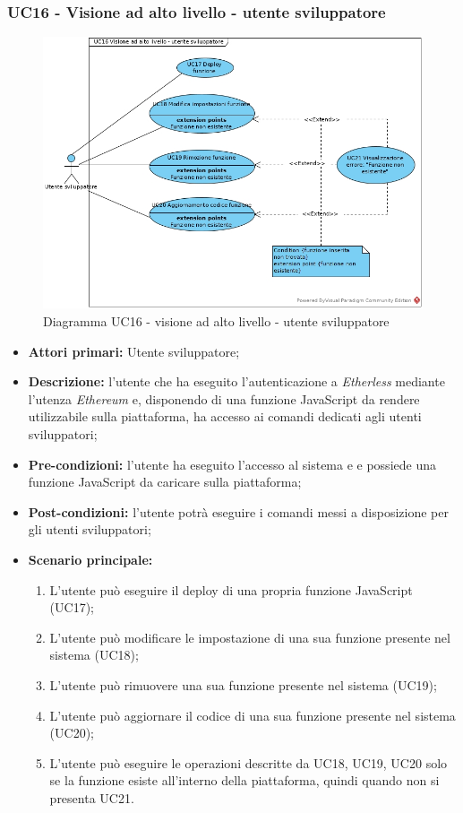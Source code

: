 \subsubsection{UC16 - Visione ad alto livello - utente sviluppatore}
\begin{figure}[h]
	\centering
	\includegraphics[width=\linewidth]{res/img/UC16.jpg}
	\caption{Diagramma UC16 - visione ad alto livello - utente sviluppatore}
\end{figure}
\begin{itemize}
	\item \textbf{Attori primari:} Utente sviluppatore;
	\item \textbf{Descrizione:} l'utente che ha eseguito l'autenticazione a \textit{Etherless} mediante l'utenza \textit{Ethereum\glo} e, disponendo di una funzione JavaScript da rendere utilizzabile sulla piattaforma, ha accesso ai comandi dedicati agli utenti sviluppatori;
	\item \textbf{Pre-condizioni:} l'utente ha eseguito l'accesso al sistema e e possiede una funzione JavaScript da caricare sulla piattaforma;
	\item \textbf{Post-condizioni:} l'utente potrà eseguire i comandi messi a disposizione per gli utenti sviluppatori;
	\item \textbf{Scenario principale:}
	\begin{enumerate}
		\item L'utente può eseguire il deploy di una propria funzione JavaScript (UC17);
		\item L'utente può modificare le impostazione di una sua funzione presente nel sistema (UC18);
		\item L'utente può rimuovere una sua funzione presente nel sistema (UC19);
		\item L'utente può aggiornare il codice di una sua funzione presente nel sistema (UC20);
		\item L'utente può eseguire le operazioni descritte da UC18, UC19, UC20 solo se la funzione esiste all'interno della piattaforma, quindi quando non si presenta UC21.
	\end{enumerate}
\end{itemize}
